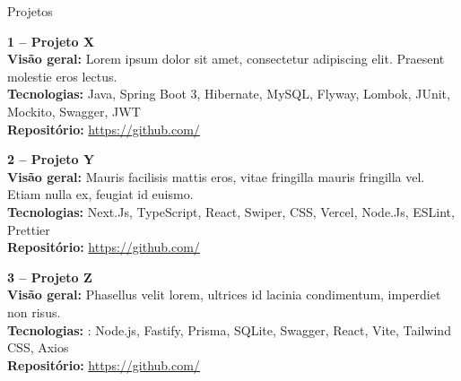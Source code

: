 \documentclass{resume} %
\begin{document}
\begin{rSection}{Projetos}
\vspace{-1.25em}

\item \textbf{1 – Projeto X}\\
\vspace{0.25em}
{\textbf {Visão geral:} Lorem ipsum dolor sit amet, consectetur adipiscing elit. Praesent molestie eros lectus.}\\
{\textbf {Tecnologias:} Java, Spring Boot 3, Hibernate, MySQL, Flyway, Lombok, JUnit, Mockito, Swagger, JWT}\\
{\textbf {Repositório: } \href{https://github.com/}{https://github.com/}}\\

\vspace{1.25em}

\item \textbf{2 – Projeto Y}\\
\vspace{0.25em}
{\textbf {Visão geral:} Mauris facilisis mattis eros, vitae fringilla mauris fringilla vel. Etiam nulla ex, feugiat id euismo.}\\
{\textbf {Tecnologias:}  Next.Js, TypeScript, React, Swiper, CSS, Vercel, Node.Js, ESLint, Prettier}\\
{\textbf {Repositório: } \href{https://github.com/}{https://github.com/}}\\

\vspace{1.25em}

\item \textbf{3 – Projeto Z}\\
\vspace{0.25em}
{\textbf {Visão geral:} Phasellus velit lorem, ultrices id lacinia condimentum, imperdiet non risus.}\\
{\textbf {Tecnologias:} : Node.js, Fastify, Prisma, SQLite, Swagger, React, Vite, Tailwind CSS, Axios}\\
{\textbf {Repositório: } \href{https://github.com/}{https://github.com/}}\\
\end{rSection} 

\end{document}
